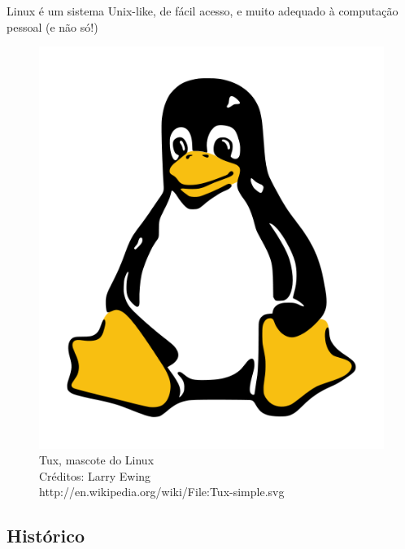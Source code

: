 \documentclass{beamer}
\begin{document}
\begin{frame}
  Linux é um sistema Unix-like, de fácil acesso, e muito adequado à
  computação pessoal (e não só!)

  \begin{figure}
    \includegraphics[scale=0.2]{images/tux.png}
    \footnotesize{
    \\Tux, mascote do Linux
    \\Créditos: Larry Ewing
    \\http://en.wikipedia.org/wiki/File:Tux-simple.svg
    }
  \end{figure}
\end{frame}

\subsection{Histórico}
\end{document}
